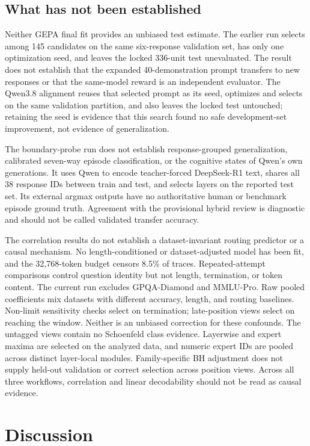 \subsection{What has not been established}

Neither GEPA final fit provides an unbiased test estimate.  The earlier run selects
among 145 candidates on the same six-response validation set, has only one
optimization seed, and leaves the locked 336-unit test unevaluated.  The result
does not establish that the expanded 40-demonstration prompt transfers to new
responses or that the same-model reward is an independent evaluator.  The
Qwen3.8 alignment reuses that selected prompt as its seed, optimizes and
selects on the same validation partition, and also leaves the locked test
untouched; retaining the seed is evidence that this search found no safe
development-set improvement, not evidence of generalization.

The boundary-probe run does not establish response-grouped generalization,
calibrated seven-way episode classification, or the cognitive states of Qwen's
own generations.  It uses Qwen to encode teacher-forced DeepSeek-R1 text,
shares all 38 response IDs between train and test, and selects layers on the
reported test set.  Its external argmax outputs have no authoritative human or
benchmark episode ground truth.  Agreement with the provisional hybrid review
is diagnostic and should not be called validated transfer accuracy.

The correlation results do not establish a dataset-invariant routing
predictor or a causal mechanism. No length-conditioned or dataset-adjusted
model has been fit, and the 32,768-token budget censors 8.5\% of traces.
Repeated-attempt comparisons control question identity but not length,
termination, or token content. The current run excludes GPQA-Diamond and
MMLU-Pro. Raw pooled coefficients mix datasets with different accuracy,
length, and routing baselines. Non-limit sensitivity checks select on
termination; late-position views select on reaching the window. Neither is
an unbiased correction for these confounds. The untagged views contain no
Schoenfeld class evidence. Layerwise and expert maxima are selected on the
analyzed data, and numeric expert IDs are pooled across distinct layer-local
modules. Family-specific BH adjustment does not supply held-out validation
or correct selection across position views. Across all three workflows,
correlation and linear decodability should not be read as causal evidence.

\section{Discussion}

